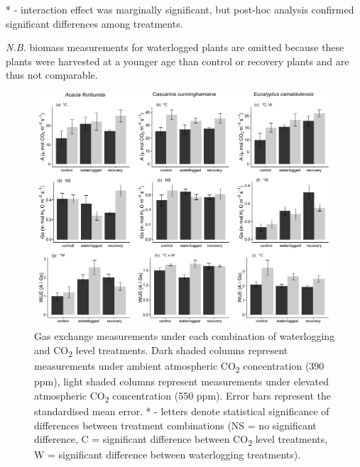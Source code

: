 \documentclass[openright,12pt,a4paper]{memoir}
\begin{document}
\begin{landscape}
\begin{tiny}
{\begin{longtabu}
{* - interaction effect was marginally significant, but post-hoc analysis confirmed significant differences among treatments.

\textit{N.B.} biomass measurements for waterlogged plants are omitted because these plants were harvested at a younger age than control or recovery plants and are thus not comparable.}
\end{longtabu}
}
\end{tiny}

\end{landscape}

\begin{figure}[h!]
\begin{center}
\includegraphics[width=\linewidth,keepaspectratio=true]{gasexchange.pdf} %
\caption[Gas exchange measurements under each combination of waterlogging and CO\textsubscript{2} level treatments.]{\small{Gas exchange measurements under each combination of waterlogging and CO\textsubscript{2} level treatments. Dark shaded columns represent measurements under ambient atmospheric CO\textsubscript{2} concentration (390 ppm), light shaded columns represent measurements under elevated atmospheric CO\textsubscript{2} concentration (550 ppm). Error bars represent the standardised mean error. * - letters denote statistical significance of differences between treatment combinations (NS = no significant difference, C = significant difference between CO\textsubscript{2} level treatments, W = significant difference between waterlogging treatments).}} %
\label{Ch5_F1} %
\end{center}
\end{figure}
\end{document}
